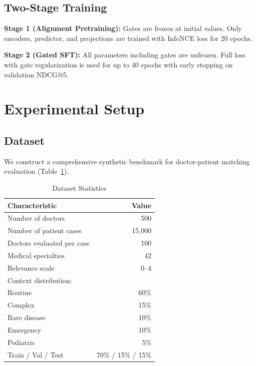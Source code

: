\documentclass[journal]{IEEEtran}
\begin{document}
\subsection{Two-Stage Training}

\textbf{Stage 1 (Alignment Pretraining):} Gates are frozen at
initial values. Only encoders, predictor, and projections are
trained with InfoNCE loss for 20 epochs.

\textbf{Stage 2 (Gated SFT):} All parameters including gates
are unfrozen. Full loss with gate regularization is used for
up to 40 epochs with early stopping on validation NDCG@5.

\section{Experimental Setup}

\subsection{Dataset}

We construct a comprehensive synthetic benchmark for
doctor-patient matching evaluation (Table~\ref{tab:dataset}).

\begin{table}[t]
\centering
\caption{Dataset Statistics}
\label{tab:dataset}
\begin{tabular}{@{}lr@{}}
\toprule
\textbf{Characteristic} & \textbf{Value} \\
\midrule
Number of doctors & 500 \\
Number of patient cases & 15,000 \\
Doctors evaluated per case & 100 \\
Medical specialties & 42 \\
Relevance scale & 0--4 \\
\midrule
Context distribution: & \\
\quad Routine & 60\% \\
\quad Complex & 15\% \\
\quad Rare disease & 10\% \\
\quad Emergency & 10\% \\
\quad Pediatric & 5\% \\
\midrule
Train / Val / Test & 70\% / 15\% / 15\% \\
\bottomrule
\end{tabular}
\end{table}
\end{document}
